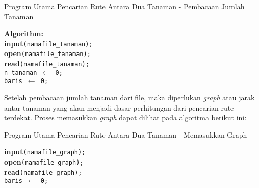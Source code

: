 \documentclass[conference]{IEEEtran}
\begin{document}
\vspace{-11pt}

\begin{algorithm}
    \caption{Program Utama Pencarian Rute Antara Dua Tanaman - Pembacaan Jumlah Tanaman}
    \SetAlgoLined
    \DontPrintSemicolon
   
    \textbf{Algorithm:}\\
    \textbf{input}\texttt{(namafile\_tanaman);}\\
    \textbf{open}\texttt{(namafile\_tanaman);}\\
    \textbf{read}\texttt{(namafile\_tanaman);}\\
    \texttt{n\_tanaman $\gets$ 0;}\\
    \texttt{baris $\gets$ 0;}\\
\end{algorithm}

\vspace{-11pt}

Setelah pembacaan jumlah tanaman dari file, maka diperlukan \textit{graph} atau jarak antar tanaman yang akan menjadi dasar perhitungan dari pencarian rute terdekat. Proses memasukkan \textit{graph} dapat dilihat pada algoritma berikut ini:

\vspace{-11pt}

\begin{algorithm}
    \caption{Program Utama Pencarian Rute Antara Dua Tanaman - Memasukkan Graph}
    \SetAlgoLined
    \DontPrintSemicolon
   
    \textbf{input}\texttt{(namafile\_graph);}\\
    \textbf{open}\texttt{(namafile\_graph);}\\
    \textbf{read}\texttt{(namafile\_graph);}\\
    \texttt{baris $\gets$ 0;}\\
\end{algorithm}
\end{document}
